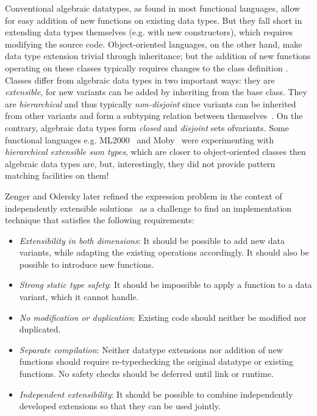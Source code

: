 Conventional algebraic datatypes, as found in most functional languages,
allow for easy addition of new functions on existing data types.
But they fall short in extending data types themselves 
(e.g. with new constructors), 
which requires modifying the source code. Object-oriented languages, on the 
other hand, make data type extension trivial through inheritance;
but the addition of new functions operating on these classes typically
requires changes to the class definition \cite{Cook90,exprproblem}. 
Classes differ from algebraic data  types in two important ways: they
are \emph{extensible}, for new variants can be added by inheriting from
the base class.  They are \emph{hierarchical} and thus typically
\emph{non-disjoint} since variants can be inherited from other variants
and form a subtyping relation between themselves~\cite{Glew99}. 
On the contrary, algebraic data types form \emph{closed} and \emph{disjoint}
sets ofvariants. Some functional languages e.g. ML2000~\cite{ML2000}
and Moby~\cite{Moby} were experimenting with 
\emph{hierarchical extensible sum types}, which are closer to 
object-oriented classes then algebraic data types are, but, 
interestingly, they did not provide pattern matching facilities on them!

Zenger and Odersky later refined the expression problem in the context of 
independently extensible solutions~\cite{fool12} as a challenge to find an 
implementation technique that satisfies the following requirements:

\begin{itemize}
\setlength{\itemsep}{0pt}
\setlength{\parskip}{0pt}
\item \emph{Extensibility in both dimensions}: It should be possible to add new 
      data variants, while adapting the existing operations accordingly. It 
      should also be possible to introduce new functions. 
\item \emph{Strong static type safety}: It should be impossible to apply a 
      function to a data variant, which it cannot handle. 
\item \emph{No modification or duplication}: Existing code should neither be 
      modified nor duplicated.
\item \emph{Separate compilation}: Neither datatype extensions nor addition of 
      new functions should require re-typechecking the original datatype or 
      existing functions. No safety checks should be deferred until link or 
      runtime.
\item \emph{Independent extensibility}: It should be possible to combine 
      independently developed extensions so that they can be used jointly.
\end{itemize}

